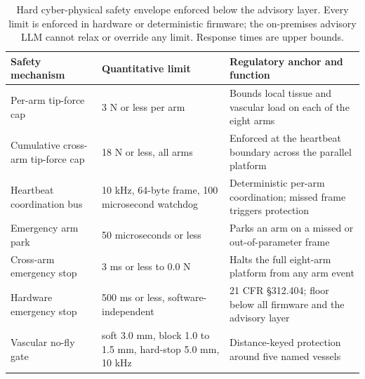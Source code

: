 \begin{table}[t]
\caption{Hard cyber-physical safety envelope enforced below the advisory layer.
Every limit is enforced in hardware or deterministic firmware; the on-premises
advisory LLM cannot relax or override any limit. Response times are upper bounds.}
\label{tab:sec02-envelope}
\centering
\begin{tabularx}{\textwidth}{L{4.8cm} L{3.6cm} Y}
\toprule
\textbf{Safety mechanism} & \textbf{Quantitative limit} & \textbf{Regulatory anchor and function} \\
\midrule
Per-arm tip-force cap & 3 N or less per arm & Bounds local tissue and vascular load on each of the eight arms \\
Cumulative cross-arm tip-force cap & 18 N or less, all arms & Enforced at the heartbeat boundary across the parallel platform \\
Heartbeat coordination bus & 10 kHz, 64-byte frame, 100 microsecond watchdog & Deterministic per-arm coordination; missed frame triggers protection \\
Emergency arm park & 50 microseconds or less & Parks an arm on a missed or out-of-parameter frame \\
Cross-arm emergency stop & 3 ms or less to 0.0 N & Halts the full eight-arm platform from any arm event \\
Hardware emergency stop & 500 ms or less, software-independent & 21 CFR \S 312.404; floor below all firmware and the advisory layer \\
Vascular no-fly gate & soft 3.0 mm, block 1.0 to 1.5 mm, hard-stop 5.0 mm, 10 kHz & Distance-keyed protection around five named vessels \\
\bottomrule
\end{tabularx}
\end{table}


